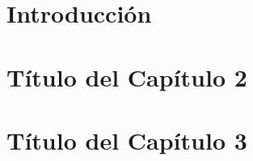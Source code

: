 \documentclass[spanish,a4paper,12pt,oneside]{extreport}
\begin{document}
\pagestyle{myheadings} %



\renewcommand{\thepage}{\roman{page}}
\setcounter{page}{1}
\pagestyle{plain} 


\tableofcontents

\newpage{\pagestyle{empty}}

\listoffigures

\newpage{\pagestyle{empty}}

\listoftables

\newpage{\pagestyle{empty}}

\newpage
\thispagestyle{empty}

\renewcommand{\thepage}{\arabic{page}}
\setcounter{page}{1}
\pagestyle{plain}

\chapter{\LARGE Introducción}
\label{chapter:intro}


\newpage{\pagestyle{empty}}
\thispagestyle{empty}

\chapter{\LARGE Título del Capítulo 2}
\label{chapter:dos}



\newpage{\pagestyle{empty}}
\thispagestyle{empty}

\chapter{\LARGE Título del Capítulo 3}
\label{chapter:tres}
\end{document}
